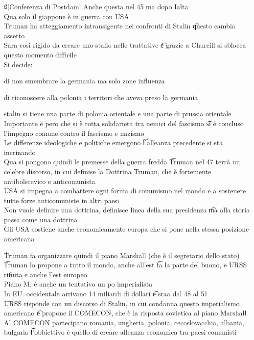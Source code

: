 \documentclass[12pt]{article}
\begin{document}
\ss[Conferenza di Postdam]
Anche questa nel 45 ma dopo Ialta \\
Qua solo il giappone è in guerra con USA \\
Truman ha atteggiamento intransigente nei confronti di Stalin \t questo cambia assetto \\
Sara cosi rigido da creare uno stallo nelle trattative \t e grazie a Churcill si sblocca questo momento difficile \\
Si decide:
\bi
\item di non smembrare la germania ma solo zone influenza
\item di riconoscere alla polonia i territori che aveva preso la germania
\item stalin si tiene una parte di polonia orientale e una parte di prussia orientale
\ei
Importante è pero che si è rotta solidarieta tra nemici del fascismo \t si è concluso l'impegno comune contro il fascismo e nazismo \\
Le differenze ideologiche e politiche emergono \t l'alleanza precedente si sta incrinando \\
Qua si pongono quindi le premesse della guerra fredda \t Truman nel 47 terrà un celebre discorso, in cui definise la Dottrina Truman, che è fortemente antibolscevico e anticomunista \\
USA si impegna a combattere ogni forma di comunismo nel mondo e a sostenere tutte forze anticomuniste in altri paesi \\
Non vuole definire una dottrina, definisce linea della sua presidenza \t ma alla storia passa come una dottrina \\
Gli USA sostiene anche economicamente europa che si pone nella stessa posizione americana

\v

Truman fa organizzare quindi il piano Marshall (che è il segretario dello stato) \t Truman lo propone a tutto il mondo, anche all'est \t fa la parte del buono, e URSS rifiuta e anche l'est europeo \\
Piano M. è anche un tentativo un po imperialista \\
In EU. occidentale arrivano 14 miliardi di dollari \t e sraa dal 48 al 51 \\
URSS risponde con un discorso di Stalin, in cui condanna questo imperialismo americano \t e propone il COMECON, che è la risposta sovietica al piano Marshall \\
Al COMECON partecipano romania, ungheria, polonia, cecoslovacchia, albania, bulgaria \t l'obbiettivo è quello di creare alleanza economica tra paesi comunisti
\end{document}

